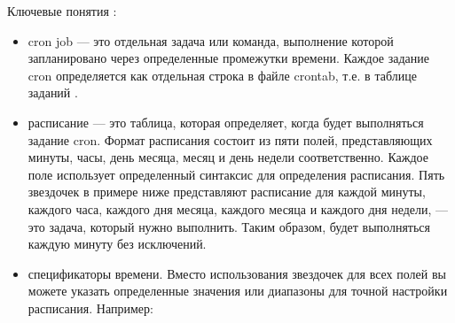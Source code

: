 \documentclass[letterpaper,10pt,russian]{sphinxmanual}
\begin{document}
\sphinxAtStartPar
Ключевые понятия :
\begin{itemize}
\item {} 
\sphinxAtStartPar
cron job — это отдельная задача или команда, выполнение которой запланировано через определенные промежутки времени. Каждое задание cron определяется как отдельная строка в файле crontab, т.е. в таблице заданий .

\item {} 
\sphinxAtStartPar
расписание — это таблица, которая определяет, когда будет выполняться задание cron. Формат расписания состоит из пяти полей, представляющих минуты, часы, день месяца, месяц и день недели соответственно. Каждое поле использует определенный синтаксис для определения расписания. Пять звездочек в примере ниже представляют расписание для каждой минуты, каждого часа, каждого дня месяца, каждого месяца и каждого дня недели,  — это задача, который нужно выполнить. Таким образом,  будет выполняться каждую минуту без исключений.

\end{itemize}

\begin{sphinxVerbatim}[commandchars=\\\{\}]
         
\end{sphinxVerbatim}
\begin{itemize}
\item {} 
\sphinxAtStartPar
спецификаторы времени. Вместо использования звездочек для всех полей вы можете указать определенные значения или диапазоны для точной настройки расписания. Например:

\end{itemize}
\end{document}
